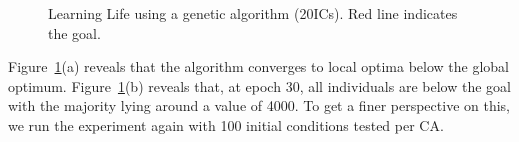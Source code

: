 \begin{figure}[!h]
\centering
            \hfill
            \hfill
            \caption{Learning Life using a genetic algorithm (20ICs). Red line indicates the goal.}
\label{fig:life-nothing}
\end{figure}

Figure~\ref{fig:life-nothing}(a) reveals that the algorithm converges to local optima below the global optimum. Figure~\ref{fig:life-nothing}(b) reveals that, at epoch 30, all individuals are below the goal with the majority lying around a value of 4000. To get a finer perspective on this, we run the experiment again with 100 initial conditions tested per CA.

